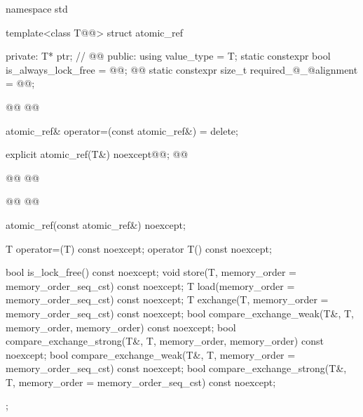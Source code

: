 \begin{codeblock}
namespace std {

  template<class T@@> struct atomic_ref {
  private:
    T* ptr;      // \expos
    @@
  public:
    using value_type = T;
    static constexpr bool is_always_lock_free = @@;
    @@
    static constexpr size_t required_@_@alignment = @@;

    @@
    @@

    atomic_ref& operator=(const atomic_ref&) = delete;

    explicit atomic_ref(T&) noexcept@\added{(\seebelow)}@;
    @@
   
    @@
    @@
    
    @@
    @@

    atomic_ref(const atomic_ref&) noexcept;

    T operator=(T) const noexcept;
    operator T() const noexcept;

    bool is_lock_free() const noexcept;
    void store(T, memory_order = memory_order_seq_cst) const noexcept;
    T load(memory_order = memory_order_seq_cst) const noexcept;
    T exchange(T, memory_order = memory_order_seq_cst) const noexcept;
    bool compare_exchange_weak(T&, T,
                               memory_order, memory_order) const noexcept;
    bool compare_exchange_strong(T&, T,
                                 memory_order, memory_order) const noexcept;
    bool compare_exchange_weak(T&, T,
                               memory_order = memory_order_seq_cst) const noexcept;
    bool compare_exchange_strong(T&, T,
                                 memory_order = memory_order_seq_cst) const noexcept;
  };
}
\end{codeblock}
~\\

